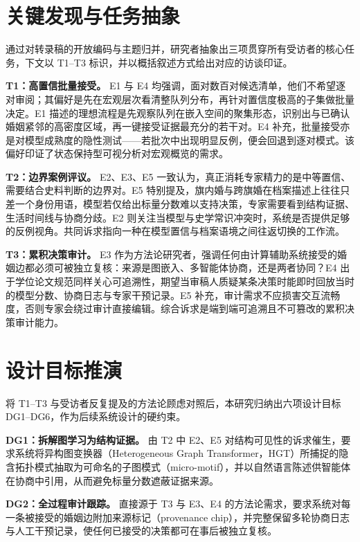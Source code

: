 \section{关键发现与任务抽象}\label{sec:formative-tasks}

通过对转录稿的开放编码与主题归并，研究者抽象出三项贯穿所有受访者的核心任务，下文以 T1--T3 标识，并以概括叙述方式给出对应的访谈印证。

\textbf{T1：高置信批量接受。} E1 与 E4 均强调，面对数百对候选清单，他们不希望逐对审阅；其偏好是先在宏观层次看清整队列分布，再针对置信度极高的子集做批量决定。E1 描述的理想流程是先观察队列在嵌入空间的聚集形态，识别出与已确认婚姻紧邻的高密度区域，再一键接受证据最充分的若干对。E4 补充，批量接受亦是对模型成熟度的隐性测试——若批次中出现明显反例，便会回退到逐对模式。该偏好印证了状态保持型可视分析对宏观概览的需求\citep{endert2017state}。

\textbf{T2：边界案例评议。} E2、E3、E5 一致认为，真正消耗专家精力的是中等置信、需要结合史料判断的边界对。E5 特别提及，旗内婚与跨旗婚在档案描述上往往只差一个身份用语，模型若仅给出标量分数难以支持决策，专家需要看到结构证据、生活时间线与协商分歧。E2 则关注当模型与史学常识冲突时，系统是否提供足够的反例视角。共同诉求指向一种在模型置信与档案语境之间往返切换的工作流。

\textbf{T3：累积决策审计。} E3 作为方法论研究者，强调任何由计算辅助系统接受的婚姻边都必须可被独立复核：来源是图嵌入、多智能体协商，还是两者协同？E4 出于学位论文规范同样关心可追溯性，期望当审稿人质疑某条决策时能即时回放当时的模型分数、协商日志与专家干预记录。E5 补充，审计需求不应损害交互流畅度，否则专家会绕过审计直接编辑。综合诉求是端到端可追溯且不可篡改的累积决策审计能力。

\section{设计目标推演}\label{sec:formative-dg}

将 T1--T3 与受访者反复提及的方法论顾虑对照后，本研究归纳出六项设计目标 DG1--DG6，作为后续系统设计的硬约束。

\textbf{DG1：拆解图学习为结构证据。} 由 T2 中 E2、E5 对结构可见性的诉求催生，要求系统将异构图变换器（Heterogeneous Graph Transformer，HGT）所捕捉的隐含拓扑模式抽取为可命名的子图模式（micro-motif），并以自然语言陈述供智能体在协商中引用，从而避免标量分数遮蔽证据来源。

\textbf{DG2：全过程审计跟踪。} 直接源于 T3 与 E3、E4 的方法论需求，要求系统对每一条被接受的婚姻边附加来源标记（provenance chip），并完整保留多轮协商日志与人工干预记录，使任何已接受的决策都可在事后被独立复核。


